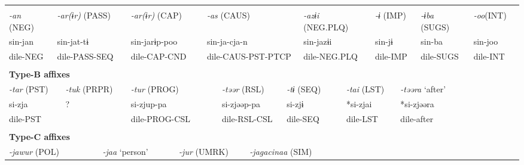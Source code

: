 \tabletail{}
\tablelasttail{}
\begin{tabularx}{\textwidth}{XXXXXXXXXXXXXXXXXXXXXX}
\lsptoprule
\multicolumn{22}{X}{{\bfseries Type-A affixes}}\\
{ \textit{{}-an} (NEG)} & \multicolumn{4}{X}{{ \textit{{}-ar(ɨr)} (PASS)}} & \multicolumn{3}{X}{{ \textit{{}-ar(ɨr)} (CAP)}} & \multicolumn{5}{X}{{ \textit{{}-as} (CAUS)}} & \multicolumn{4}{X}{{ \textit{{}-azɨi} (NEG.PLQ)}} & \multicolumn{2}{X}{{ \textit{{}-ɨ} (IMP)}} & { \textit{{}-ɨba} (SUGS)} & { \textit{{}-oo}(INT)} & \\
{ sin-jan} & \multicolumn{4}{X}{{ sin-jat-tɨ}} & \multicolumn{3}{X}{{ sin-jarɨp-poo}} & \multicolumn{5}{X}{{ sin-ja-cja-n}} & \multicolumn{4}{X}{{ sin-jazɨi}} & \multicolumn{2}{X}{{ sin-jɨ}} & { sin-ba} & { sin-joo} & \\
dile-NEG & \multicolumn{4}{X}{dile-PASS-SEQ} & \multicolumn{3}{X}{dile-CAP-CND} & \multicolumn{5}{X}{dile-CAUS-PST-PTCP} & \multicolumn{4}{X}{dile-NEG.PLQ} & \multicolumn{2}{X}{dile-IMP} & dile-SUGS & dile-INT & \\
\multicolumn{22}{X}{}\\
\multicolumn{22}{X}{{\bfseries Type-B affixes}}\\
\multicolumn{2}{X}{{ \textit{{}-tar} (PST)}} & \multicolumn{3}{X}{{ \textit{{}-tuk} (PRPR)}} & \multicolumn{4}{X}{{ \textit{{}-tur} (PROG)}} & \multicolumn{3}{X}{{ \textit{{}-təər} (RSL)}} & \multicolumn{3}{X}{{ \textit{{}-tɨ} (SEQ)}} & \multicolumn{3}{X}{{ \textit{{}-tai} (LST)}} & \multicolumn{4}{X}{{ \textit{{}-təəra} ‘after’}}\\
\multicolumn{2}{X}{{ si-zja}} & \multicolumn{3}{X}{{ ?}} & \multicolumn{4}{X}{{ si-zjup-pa}} & \multicolumn{3}{X}{{ si-zjəəp-pa}} & \multicolumn{3}{X}{{ si-zjɨ}} & \multicolumn{3}{X}{{ *si-zjai}} & \multicolumn{4}{X}{{ *si-zjəəra}}\\
\multicolumn{2}{X}{dile-PST} & \multicolumn{3}{X}{} & \multicolumn{4}{X}{dile-PROG-CSL} & \multicolumn{3}{X}{dile-RSL-CSL} & \multicolumn{3}{X}{dile-SEQ} & \multicolumn{3}{X}{dile-LST} & \multicolumn{4}{X}{{ dile-after}}\\
\multicolumn{2}{X}{} & \multicolumn{3}{X}{} & \multicolumn{4}{X}{} & \multicolumn{3}{X}{} & \multicolumn{3}{X}{} & \multicolumn{3}{X}{} & \multicolumn{4}{X}{}\\
\multicolumn{22}{X}{{\bfseries Type-C affixes}}\\
\multicolumn{4}{X}{{ \textit{{}-jawur} (POL)}} & \multicolumn{3}{X}{{ \textit{{}-jaa} ‘person’}} & \multicolumn{3}{X}{{ \textit{{}-jur} (UMRK)}} & \multicolumn{4}{X}{{ \textit{{}-jagacinaa} (SIM)}} & \multicolumn{8}{X}{}\\

\end{tabularx}
